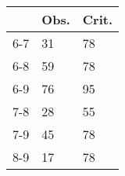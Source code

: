 \begin{table}[ht]
\centering
\begin{tabular}{rll}
  \hline
 & Obs. & Crit. \\ 
  \hline
6-7 & 31 & 78 \\ 
  6-8 & 59 & 78 \\ 
  6-9 & 76 & 95 \\ 
  7-8 & 28 & 55 \\ 
  7-9 & 45 & 78 \\ 
  8-9 & 17 & 78 \\ 
   \hline
\end{tabular}
\end{table}
